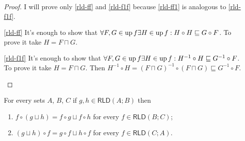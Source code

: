 \begin{proof}
I will prove only \ref{rld-ff} and \ref{rld-f1f} because \ref{rld-ff1}
is analogous to \ref{rld-f1f}.
\begin{widedisorder}
\item [{\ref{rld-ff}}] It's enough to show that $\forall F,G\in\operatorname{up} f\exists H\in\operatorname{up} f:H\circ H\sqsubseteq G\circ F$.
To prove it take $H=F\sqcap G$.
\item [{\ref{rld-f1f}}] It's enough to show that $\forall F,G\in\operatorname{up} f\exists H\in\operatorname{up} f:H^{-1}\circ H\sqsubseteq G^{-1}\circ F$.
To prove it take $H=F\sqcap G$. Then $H^{-1}\circ H=(F\sqcap G)^{-1}\circ(F\sqcap G)\sqsubseteq G^{-1}\circ F$.
\end{widedisorder}
\end{proof}
\begin{thm}
For every sets $A$, $B$, $C$ if $g,h\in\mathsf{RLD}(A;B)$ then
\begin{enumerate}
\item $f\circ(g\sqcup h)=f\circ g\sqcup f\circ h$ for every $f\in\mathsf{RLD}(B;C)$;
\item $(g\sqcup h)\circ f=g\circ f\sqcup h\circ f$ for every $f\in\mathsf{RLD}(C;A)$.
\end{enumerate}
\end{thm}
